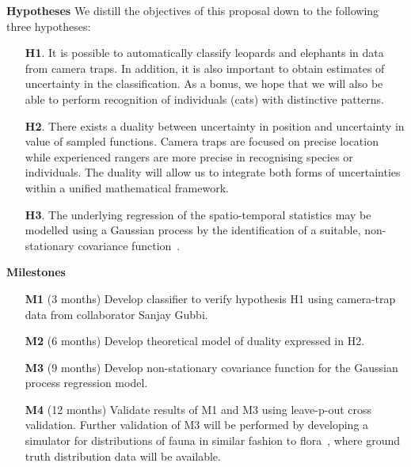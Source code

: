 \documentclass[a4paper,10pt,twocolumn]{article}
\newcommand{\hdg}[1] {\noindent \textbf{#1} }
\begin{document}
\hdg{Hypotheses}
We distill the objectives of this proposal down to the following three hypotheses:
\begin{itemize}[topsep=-2.1ex,itemsep=-.7ex,leftmargin=1ex,itemindent=3ex]
 \item [\textbf{H1}.] It is possible to automatically classify leopards and elephants in data from camera traps. In addition, it is also important to obtain estimates of uncertainty in the classification. As a bonus, we hope that we will also be able to perform recognition of individuals (cats) with distinctive patterns.
 \item [\textbf{H2}.] There exists a duality between uncertainty in position and uncertainty in value of sampled functions. Camera traps are focused on precise location while experienced rangers are more precise in recognising species or individuals. The duality will allow us to integrate both forms of uncertainties within a unified mathematical framework.
 \item [\textbf{H3}.] The underlying regression of the spatio-temporal statistics may be modelled using a Gaussian process by the identification of a suitable, non-stationary covariance function~\cite{paciorek2003nonstationary}.
\end{itemize}
\vspace{2.5ex}
% 

\hdg{Milestones}
\begin{enumerate} [topsep=-1ex,itemsep=-.1ex,leftmargin=1ex,itemindent=3ex]
 \item [\textbf{M1}] (3  months) Develop classifier to verify hypothesis H1 using camera-trap data from collaborator Sanjay Gubbi.
 \item [\textbf{M2}] (6  months) Develop theoretical model of duality expressed in H2.
 \item [\textbf{M3}] (9 months) Develop non-stationary covariance function for the Gaussian process regression model.
 \item [\textbf{M4}] (12 months) Validate results of M1 and M3 using leave-p-out cross validation. Further validation of M3 will be performed by developing a simulator for distributions of fauna in similar fashion to flora~\cite{Bradbury15Guided}, where ground truth distribution data will be available.
 \end{enumerate}
\vspace{2.5ex}
\end{document}
